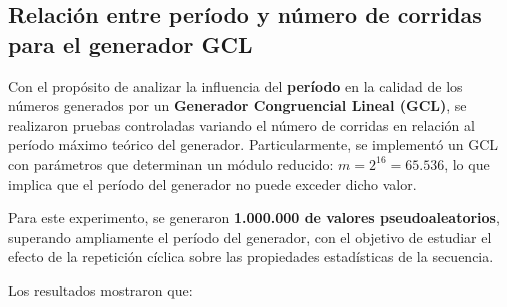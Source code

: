 \documentclass{article}
\begin{document}
\subsection{Relación entre período y número de corridas para el generador GCL}

Con el propósito de analizar la influencia del \textbf{período} en la calidad de los números generados por un \textbf{Generador Congruencial Lineal (GCL)}, se realizaron pruebas controladas variando el número de corridas en relación al período máximo teórico del generador. Particularmente, se implementó un GCL con parámetros que determinan un módulo reducido: \( m = 2^{16} = 65.536 \), lo que implica que el período del generador no puede exceder dicho valor.

Para este experimento, se generaron \textbf{1.000.000 de valores pseudoaleatorios}, superando ampliamente el período del generador, con el objetivo de estudiar el efecto de la repetición cíclica sobre las propiedades estadísticas de la secuencia.

Los resultados mostraron que:
\end{document}
